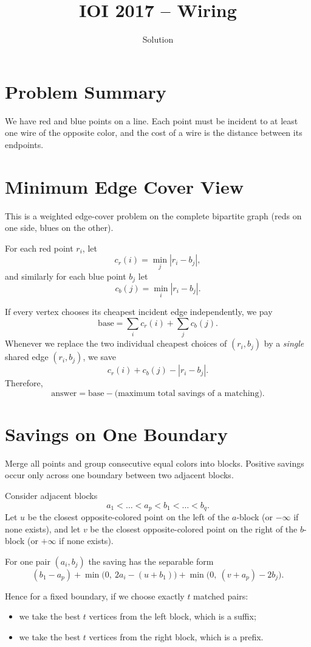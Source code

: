 \documentclass[11pt,a4paper]{article}
\title{IOI 2017 -- Wiring}
\author{Solution}
\date{}
\begin{document}
\maketitle

\section{Problem Summary}
We have red and blue points on a line.
Each point must be incident to at least one wire of the opposite color, and the cost of a wire is
the distance between its endpoints.

\section{Minimum Edge Cover View}
This is a weighted edge-cover problem on the complete bipartite graph
(reds on one side, blues on the other).

For each red point $r_i$, let
\[
c_r(i)=\min_j |r_i-b_j|,
\]
and similarly for each blue point $b_j$ let
\[
c_b(j)=\min_i |r_i-b_j|.
\]

If every vertex chooses its cheapest incident edge independently, we pay
\[
\text{base}=\sum_i c_r(i)+\sum_j c_b(j).
\]
Whenever we replace the two individual cheapest choices of $(r_i,b_j)$ by a \emph{single}
shared edge $(r_i,b_j)$, we save
\[
c_r(i)+c_b(j)-|r_i-b_j|.
\]
Therefore,
\[
\text{answer}=\text{base}-\text{(maximum total savings of a matching)}.
\]

\section{Savings on One Boundary}
Merge all points and group consecutive equal colors into blocks.
Positive savings occur only across one boundary between two adjacent blocks.

Consider adjacent blocks
\[
a_1 < \dots < a_p < b_1 < \dots < b_q.
\]
Let $u$ be the closest opposite-colored point on the left of the $a$-block
(or $-\infty$ if none exists), and let $v$ be the closest opposite-colored point on the right
of the $b$-block (or $+\infty$ if none exists).

For one pair $(a_i,b_j)$ the saving has the separable form
\[
(b_1-a_p)
 + \min\!\bigl(0,\ 2a_i-(u+b_1)\bigr)
 + \min\!\bigl(0,\ (v+a_p)-2b_j\bigr).
\]

Hence for a fixed boundary, if we choose exactly $t$ matched pairs:
\begin{itemize}
  \item we take the best $t$ vertices from the left block, which is a suffix;
  \item we take the best $t$ vertices from the right block, which is a prefix.
\end{itemize}
\end{document}
